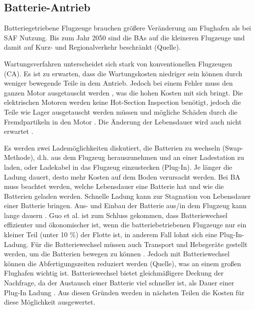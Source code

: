 \subsection{Batterie-Antrieb}
Batteriegetriebene Flugzeuge brauchen größere Veränderung am Flughafen als bei SAF Nutzung.
Bis zum Jahr 2050 sind die BAs auf die kleineren Flugzeuge und damit auf Kurz- und Regionalverkehr beschränkt (Quelle). 

Wartungsverfahren unterscheidet sich stark von konventionellen Flugzeugen (CA). 
Es ist zu erwarten, dass die Wartungskosten niedriger sein können durch weniger bewegende Teile in dem Antrieb. 
Jedoch bei einem Fehler muss den ganzen Motor ausgetauscht werden \cite{dalmia2022powering}, 
was die hohen Kosten mit sich bringt.
Die elektrischen Motoren werden keine Hot-Section Inspection benötigt, jedoch die Teile wie Lager ausgetauscht werden 
müssen und mögliche Schäden durch die Fremdpartikeln in den Motor \cite{reimers2018introduction}. 
Die Änderung der Lebensdauer wird auch nicht erwartet \cite{reimers2018introduction}.

Es werden zwei Lademöglichkeiten diskutiert, die Batterien zu wechseln (Swap-Methode), d.h. aus dem Flugzeug herauszunehmen und 
an einer Ladestation zu laden, oder Ladekabel in das Flugzeug einzustecken (Plug-In).
Je länger die Ladung dauert, desto mehr Kosten auf dem Boden verursacht werden. 
Bei BA muss beachtet werden, welche Lebensdauer eine Batterie hat und wie die Batterien geladen werden. 
Schnelle Ladung kann zur Stagnation von Lebensdauer einer Batterie bringen.
Aus- und Einbau der Batterie aus/in dem Flugzeug kann lange dauern \cite{dalmia2022powering}. Guo et al. \cite{guo2020aviation} ist 
zum Schluss gekommen, dass Batteriewechsel effizienter und ökonomischer ist, 
wenn die batteriebetriebenen Flugzeuge nur ein kleiner Teil (unter 10 \%) der Flotte ist, in anderem Fall lohnt sich eine Plug-In-Ladung. 
Für die Batteriewechsel müssen auch Transport und Hebegeräte gestellt werden, um die Batterien bewegen zu können \cite{reimers2018introduction}.
Jedoch mit Batteriewechsel können die Abfertigungszeiten reduziert werden (Quelle), was an einem großen Flughafen wichtig ist. 
Batteriewechsel bietet gleichmäßigere Deckung der Nachfrage, 
da der Austausch einer Batterie viel schneller ist, als Dauer einer Plug-In Ladung \cite{guo2020aviation}.
Aus diesen Gründen werden in nächsten Teilen die Kosten für diese Möglichkeit ausgewertet.

